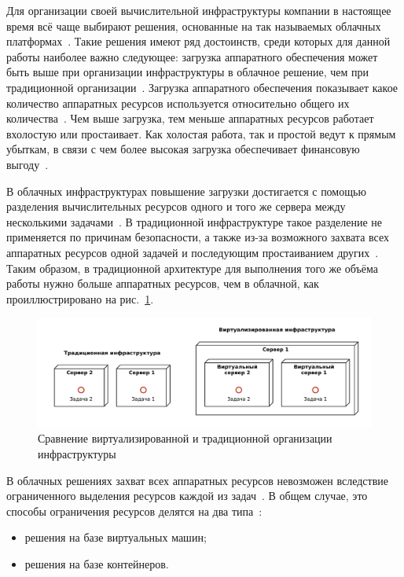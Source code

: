 Для организации своей вычислительной инфраструктуры компании в настоящее время всё чаще выбирают решения, основанные на так называемых облачных платформах~\cite{fake-16}.
Такие решения имеют ряд достоинств, среди которых для данной работы наиболее важно следующее: загрузка аппаратного обеспечения может быть выше при организации инфраструктуры в облачное решение, чем при традиционной организации~\cite{cloud-computing-concepts}.
Загрузка аппаратного обеспечения показывает какое количество аппаратных ресурсов используется относительно общего их количества~\cite{fake-17}.
Чем выше загрузка, тем меньше аппаратных ресурсов работает вхолостую или простаивает.
Как холостая работа, так и простой ведут к прямым убыткам, в связи с чем более высокая загрузка обеспечивает финансовую выгоду~\cite{fake-19}.

В облачных инфраструктурах повышение загрузки достигается с помощью разделения вычислительных ресурсов одного и того же сервера между несколькими задачами~\cite{fake-20}.
В традиционной инфраструктуре такое разделение не применяется по причинам безопасности, а также из-за возможного захвата всех аппаратных ресурсов одной задачей и последующим простаиванием других~\cite{fake-22}.
Таким образом, в традиционной архитектуре для выполнения того же объёма работы нужно больше аппаратных ресурсов, чем в облачной, как проиллюстрировано на рис.~\ref{load-utilization}.

\begin{figure}[hbtp]
    \centering
    \includegraphics[width=\textwidth]{img/trad-cloud.pdf}
    \caption{Сравнение виртуализированной и традиционной организации инфраструктуры}
    \label{load-utilization}
\end{figure}

В облачных решениях захват всех аппаратных ресурсов невозможен вследствие ограниченного выделения ресурсов каждой из задач~\cite{fake-23}.
В общем случае, это способы ограничения ресурсов делятся на два типа~\cite{containers-and-vm-big-data}:
\begin{itemize}
    \item решения на базе виртуальных машин;
    \item решения на базе контейнеров.
\end{itemize}

